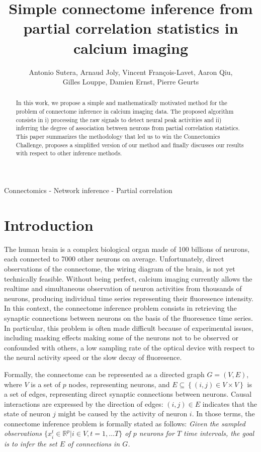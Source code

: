 \documentclass[wcp]{jmlr}
\title{Simple connectome inference from partial correlation statistics in calcium imaging}
\author{Antonio Sutera,
        Arnaud Joly,
        Vincent François-Lavet,
        Aaron Qiu, \\
        Gilles Louppe,
        Damien Ernst,
        Pierre Geurts}
\begin{document}
\maketitle

\begin{abstract}
In this work, we propose a simple and mathematically motivated method for the
problem of connectome inference in calcium imaging data. The proposed algorithm
consists in i) processing the raw signals to detect neural peak activities and ii)
inferring the degree of association between neurons from partial correlation
statistics.  This paper summarizes the methodology that led us to win the
Connectomics Challenge, proposes a simplified version of our method and finally
discusses our results with respect to other inference methods.
\end{abstract}

\begin{keywords}
Connectomics - Network inference - Partial correlation
\end{keywords}


\section{Introduction}\label{sec:intro}

The human brain is a complex biological organ made of 100 billions of neurons,
each connected to 7000 other neurons on average. Unfortunately, direct
observations of the connectome, the wiring diagram of the brain, is not yet
technically feasible. Without being perfect, calcium imaging currently allows
the realtime and simultaneous observation of neuron activities from thousands
of neurons, producing individual time series representing their fluoresence
intensity. In this context,  the connectome inference problem consists in
retrieving the synaptic connections between neurons on the basis of the
fluoresence time series. In particular, this problem is often made difficult
because of experimental issues, including masking effects making some of the
neurons not to be observed or confounded with others, a low sampling rate of
the optical device with respect to the neural activity speed or the slow decay
of fluoresence.

Formally, the connectome can be represented as a directed graph $G=(V,E)$,
where $V$ is a set of $p$ nodes, representing neurons, and $E \subseteq
\left\{(i, j) \in V \times V\right\}$ is a set of edges, representing direct
synaptic connections between neurons. Causal interactions are expressed by the
direction of edges: $(i, j) \in E$ indicates that the state of neuron $j$ might
be caused by the activity of neuron $i$. In those terms,  the connectome
inference problem is formally stated as follows:  \textit{Given the sampled
observations $\{ x^t_i \in \mathbb{R}^{p} | i \in V, t = 1, \dots T \}$ of $p$
neurons for $T$ time intervals, the goal is to infer the set $E$ of connections in $G$.}
\end{document}
